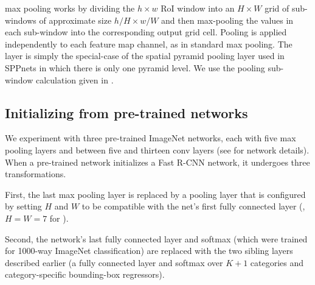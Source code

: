 \roi max pooling works by dividing the $h \times w$ RoI window into an $H \times W$ grid of sub-windows of approximate size $h / H \times w / W$ and then max-pooling the values in each sub-window into the corresponding output grid cell.
Pooling is applied independently to each feature map channel, as in standard max pooling.
The \roi layer is simply the special-case of the spatial pyramid pooling layer used in SPPnets \cite{he2014spp} in which there is only one pyramid level.
We use the pooling sub-window calculation given in \cite{he2014spp}.


%

\subsection{Initializing from pre-trained networks}
We experiment with three pre-trained ImageNet \cite{imagenet_cvpr09} networks, each with five max pooling layers and between five and thirteen conv layers (see  for network details).
When a pre-trained network initializes a Fast R-CNN network, it undergoes three transformations.

First, the last max pooling layer is replaced by a \roi pooling layer that is configured by setting $H$ and $W$ to be compatible with the net's first fully connected layer (\eg, $H = W = 7$ for \vggsixteen).

Second, the network's last fully connected layer and softmax (which were trained for 1000-way ImageNet classification) are replaced with the two sibling layers described earlier (a fully connected layer and softmax over $K + 1$ categories and category-specific bounding-box regressors).

